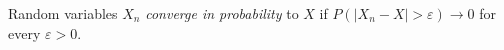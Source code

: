 
Random variables $X_n$ \emph{converge in probability} to $X$ if $P(|X_n-X|>\varepsilon)\to0$ for every $\varepsilon>0$.
